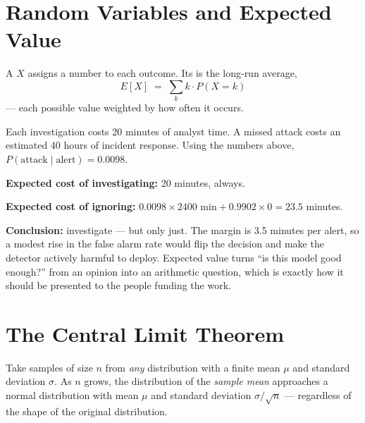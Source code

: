\section{Random Variables and Expected Value}

\begin{definitionbox}
A  $X$ assigns a number to each outcome. Its  is the long-run average,
\[
E[X] \;=\; \sum_{k} k \cdot P(X = k)
\]
--- each possible value weighted by how often it occurs.
\end{definitionbox}

\begin{worked}
Each investigation costs 20 minutes of analyst time. A missed attack costs an
estimated 40 hours of incident response. Using the numbers above,
$P(\text{attack} \mid \text{alert}) = 0.0098$.

\smallskip
\textbf{Expected cost of investigating:} 20 minutes, always.

\textbf{Expected cost of ignoring:}
$0.0098 \times 2400 \text{ min} + 0.9902 \times 0 = 23.5$ minutes.

\smallskip
\textbf{Conclusion:} investigate --- but only just. The margin is 3.5 minutes per
alert, so a modest rise in the false alarm rate would flip the decision and make
the detector actively harmful to deploy. Expected value turns ``is this model good
enough?'' from an opinion into an arithmetic question, which is exactly how it
should be presented to the people funding the work.
\end{worked}

\section{The Central Limit Theorem}

\begin{definitionbox}
Take samples of size $n$ from \emph{any} distribution with a finite mean $\mu$ and
standard deviation $\sigma$. As $n$ grows, the distribution of the \emph{sample
mean} approaches a normal distribution with mean $\mu$ and standard deviation
$\sigma/\sqrt{n}$ --- regardless of the shape of the original distribution.
\end{definitionbox}

